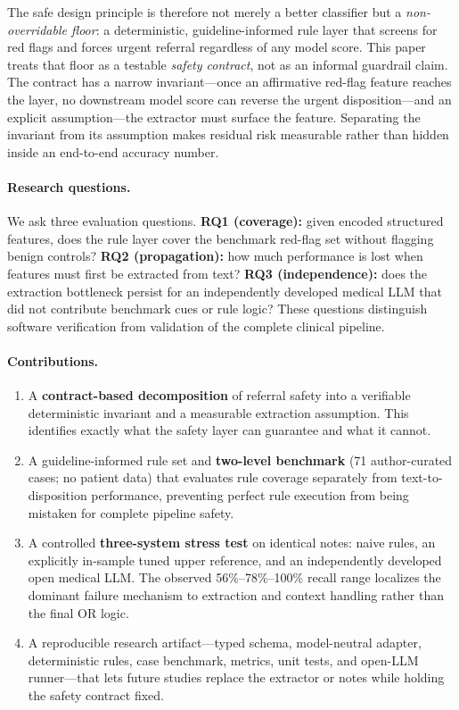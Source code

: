 \documentclass[11pt]{article}
\begin{document}
The safe design principle is therefore not merely a better classifier but a \emph{non-overridable floor}: a deterministic, guideline-informed rule layer that screens for red flags and forces urgent referral regardless of any model score. This paper treats that floor as a testable \emph{safety contract}, not as an informal guardrail claim. The contract has a narrow invariant---once an affirmative red-flag feature reaches the layer, no downstream model score can reverse the urgent disposition---and an explicit assumption---the extractor must surface the feature. Separating the invariant from its assumption makes residual risk measurable rather than hidden inside an end-to-end accuracy number.

\paragraph{Research questions.}
We ask three evaluation questions. \textbf{RQ1 (coverage):} given encoded structured features, does the rule layer cover the benchmark red-flag set without flagging benign controls? \textbf{RQ2 (propagation):} how much performance is lost when features must first be extracted from text? \textbf{RQ3 (independence):} does the extraction bottleneck persist for an independently developed medical LLM that did not contribute benchmark cues or rule logic? These questions distinguish software verification from validation of the complete clinical pipeline.

\paragraph{Contributions.}
\begin{enumerate}[leftmargin=1.5em,itemsep=1pt]
\item A \textbf{contract-based decomposition} of referral safety into a verifiable deterministic invariant and a measurable extraction assumption. This identifies exactly what the safety layer can guarantee and what it cannot.
\item A guideline-informed rule set and \textbf{two-level benchmark} (71 author-curated cases; no patient data) that evaluates rule coverage separately from text-to-disposition performance, preventing perfect rule execution from being mistaken for complete pipeline safety.
\item A controlled \textbf{three-system stress test} on identical notes: naive rules, an explicitly in-sample tuned upper reference, and an independently developed open medical LLM. The observed 56\%--78\%--100\% recall range localizes the dominant failure mechanism to extraction and context handling rather than the final OR logic.
\item A reproducible research artifact---typed schema, model-neutral adapter, deterministic rules, case benchmark, metrics, unit tests, and open-LLM runner---that lets future studies replace the extractor or notes while holding the safety contract fixed.
\end{enumerate}
\end{document}

